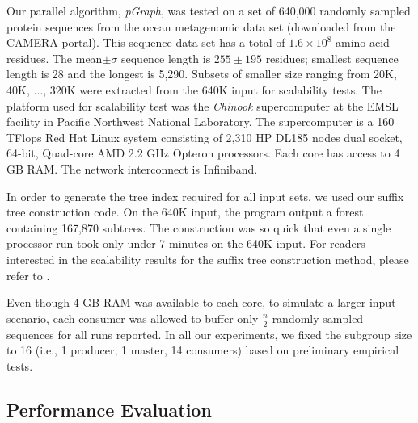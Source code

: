 \documentclass[10pt,journal,letterpaper,compsoc]{IEEEtran}
\begin{document}
Our parallel algorithm, {\it pGraph}, was tested on a set of 640,000 randomly sampled protein sequences from the ocean metagenomic data set (downloaded from the CAMERA portal). This sequence data set has a total of $1.6\times 10^8$ amino acid residues. The mean$\pm\sigma$ sequence length is $255\pm 195$ residues; smallest sequence length is 28 and the longest is 5,290. Subsets of smaller size ranging from 20K, 40K, $\ldots$, 320K were extracted from the 640K input for scalability tests. The platform used for scalability test was the {\it Chinook} supercomputer at the EMSL facility in Pacific Northwest National Laboratory. The supercomputer is a 160 TFlops Red Hat Linux system consisting of 2,310 HP DL185 nodes dual socket, 64-bit, Quad-core AMD 2.2 GHz Opteron processors. Each core has access to 4 GB RAM. The network interconnect is Infiniband. 

In order to generate the tree index required for all input sets, we used our suffix tree construction code. On the 640K input, the program output a forest containing 167,870 subtrees. The construction was so quick that even a single processor run took only under 7 minutes on the 640K input. For readers interested in the scalability results for the suffix tree construction method, please refer to \cite{Kalyanaraman07}.

Even though 4 GB RAM was available to each core, to simulate a larger input scenario, each consumer was allowed to buffer only  $\frac{n}{2}$ randomly sampled sequences for all runs reported. In all our experiments, we fixed the subgroup size to 16 (i.e., 1 producer, 1 master, 14 consumers) based on preliminary empirical tests. 


\subsection{Performance Evaluation}
\end{document}
